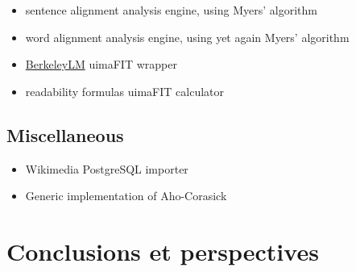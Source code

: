 \documentclass[a4paper, 11pt, onepage]{scrreprt}
\begin{document}
\begin{itemize}
\item sentence alignment analysis engine, using Myers' algorithm
\item word alignment analysis engine, using yet again Myers' algorithm
\item \href{https://berkeleylm.googlecode.com/}{BerkeleyLM} uimaFIT
  wrapper
\item readability formulas uimaFIT calculator
\end{itemize}

\section{Miscellaneous}
\label{sec:misc-software}
\begin{itemize}
\item Wikimedia PostgreSQL importer
\item Generic implementation of Aho-Corasick
\end{itemize}

\chapter{Conclusions  et perspectives}



\end{document}
